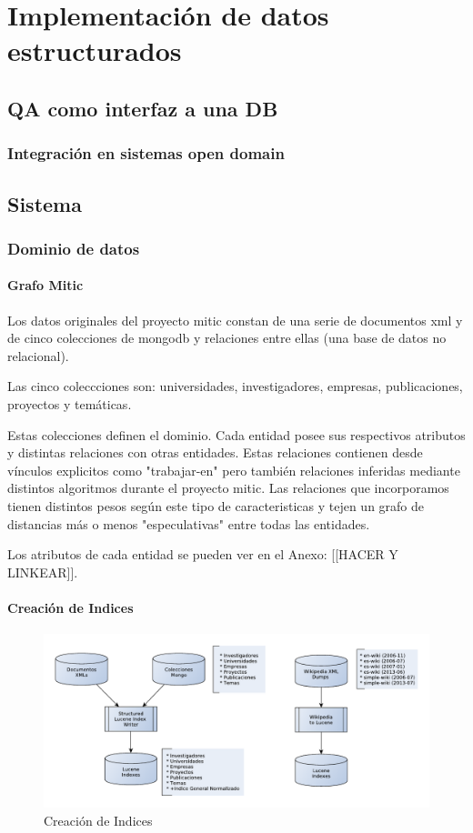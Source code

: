 \chapter{Implementación de datos estructurados}

\section{QA como interfaz a una DB}
\subsection{Integración en sistemas open domain}
\section{Sistema}
\subsection{Dominio de datos}
\subsubsection{Grafo Mitic}
Los datos originales del proyecto mitic constan de una serie de documentos 
xml y de cinco colecciones de mongodb y relaciones entre ellas (una base de datos no relacional).

Las cinco coleccciones son: universidades, investigadores, empresas,
publicaciones, proyectos y temáticas.

Estas colecciones definen el dominio. Cada entidad 
posee sus respectivos atributos y distintas relaciones con otras entidades.
Estas relaciones contienen desde vínculos explicitos como "trabajar-en"
pero también relaciones inferidas mediante distintos algoritmos durante el proyecto mitic.
Las relaciones que incorporamos tienen distintos pesos según este tipo de caracteristicas
y tejen un grafo de distancias más o menos "especulativas" entre todas las entidades.

Los atributos de cada entidad se pueden ver en el Anexo: [[HACER Y LINKEAR]].

\subsubsection{Creación de Indices}

\begin{figure}[H]
  \centering
    \includegraphics[scale=0.86]{graficos/LuceneWritersJuntos}
  \caption{Creación de Indices}
  \label{fig:LuceneIndexWriterBoth}
\end{figure}

